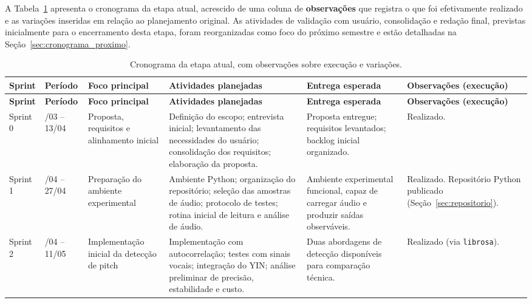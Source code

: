 A Tabela~\ref{tab:cronograma_atual} apresenta o cronograma da etapa atual,
acrescido de uma coluna de \textbf{observações} que registra o que foi
efetivamente realizado e as variações inseridas em relação ao planejamento
original. As atividades de validação com usuário, consolidação e redação final,
previstas inicialmente para o encerramento desta etapa, foram reorganizadas como
foco do próximo semestre e estão detalhadas na Seção~\ref{sec:cronograma_proximo}.

\renewcommand{\arraystretch}{1.2}
\setlength{\tabcolsep}{3pt}

\small
\begin{longtable}{|>{\raggedright\arraybackslash}p{0.9cm}|>{\raggedright\arraybackslash}p{1.6cm}|>{\raggedright\arraybackslash}p{2.1cm}|>{\raggedright\arraybackslash}p{3.5cm}|>{\raggedright\arraybackslash}p{3.0cm}|>{\raggedright\arraybackslash}p{2.6cm}|}
\caption{\label{tab:cronograma_atual}Cronograma da etapa atual, com observações sobre execução e variações.}\\
\hline
\rowcolor[gray]{0.9}
\textbf{Sprint} & \textbf{Período} & \textbf{Foco principal} & \textbf{Atividades planejadas} & \textbf{Entrega esperada} & \textbf{Observações (execução)} \\
\hline
\endfirsthead

\hline
\rowcolor[gray]{0.9}
\textbf{Sprint} & \textbf{Período} & \textbf{Foco principal} & \textbf{Atividades planejadas} & \textbf{Entrega esperada} & \textbf{Observações (execução)} \\
\hline
\endhead

Sprint 0 & 20/03 -- 13/04 & Proposta, requisitos e alinhamento inicial &
Definição do escopo; entrevista inicial; levantamento das necessidades do usuário; consolidação dos requisitos; elaboração da proposta. &
Proposta entregue; requisitos levantados; backlog inicial organizado. &
Realizado. \\
\hline

Sprint 1 & 14/04 -- 27/04 & Preparação do ambiente experimental &
Ambiente Python; organização do repositório; seleção das amostras de áudio; protocolo de testes; rotina inicial de leitura e análise de áudio. &
Ambiente experimental funcional, capaz de carregar áudio e produzir saídas observáveis. &
Realizado. Repositório Python publicado (Seção~\ref{sec:repositorio}). \\
\hline

Sprint 2 & 28/04 -- 11/05 & Implementação inicial da detecção de pitch &
Implementação com autocorrelação; testes com sinais vocais; integração do YIN; análise preliminar de precisão, estabilidade e custo. &
Duas abordagens de detecção disponíveis para comparação técnica. &
Realizado (via \texttt{librosa}). \\
\hline


\end{longtable}
